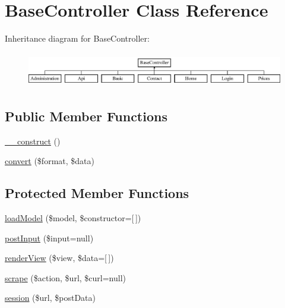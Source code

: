 \hypertarget{class_base_controller}{}\section{Base\+Controller Class Reference}
\label{class_base_controller}
Inheritance diagram for Base\+Controller\+:\begin{figure}[H]
\begin{center}
\leavevmode
\includegraphics[height=1.538461cm]{class_base_controller}
\end{center}
\end{figure}
\subsection*{Public Member Functions}
\begin{DoxyCompactItemize}
\item 
\hyperlink{class_base_controller_a095c5d389db211932136b53f25f39685}{\+\_\+\+\_\+construct} ()
\item 
\hyperlink{class_base_controller_a0fd54f433ce0bd8881479f3eb30e13ec}{convert} (\$format, \$data)
\end{DoxyCompactItemize}
\subsection*{Protected Member Functions}
\begin{DoxyCompactItemize}
\item 
\hyperlink{class_base_controller_a5fa8890bd3a9d20f5c0cc2377dc49eb1}{load\+Model} (\$model, \$constructor=\mbox{[}$\,$\mbox{]})
\item 
\hyperlink{class_base_controller_a170629218b28c1759a89c4978b9323b3}{post\+Input} (\$input=null)
\item 
\hyperlink{class_base_controller_aa0c49b95cd8e5ff8ff61b4a2c35bf1eb}{render\+View} (\$view, \$data=\mbox{[}$\,$\mbox{]})
\item 
\hyperlink{class_base_controller_abd4f25604b09a96c254491df97612cc3}{scrape} (\$action, \$url, \$curl=null)
\item 
\hyperlink{class_base_controller_a259a554926fc05640c8c711c340cdeac}{session} (\$url, \$post\+Data)
\end{DoxyCompactItemize}


